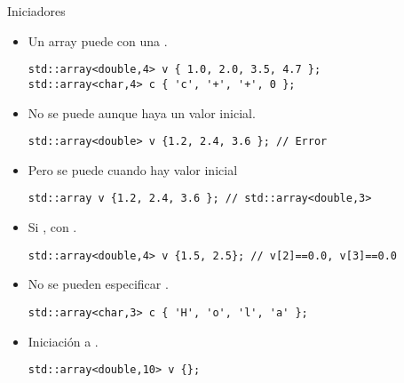 \begin{frame}[t,fragile]{Iniciadores}
\begin{itemize}
  \item Un array puede  con una .
\begin{lstlisting}
std::array<double,4> v { 1.0, 2.0, 3.5, 4.7 };
std::array<char,4> c { 'c', '+', '+', 0 };
\end{lstlisting}

  \item No se puede  aunque haya un valor inicial.
\begin{lstlisting}
std::array<double> v {1.2, 2.4, 3.6 }; // Error
\end{lstlisting}

  \item Pero se puede  cuando hay valor inicial
\begin{lstlisting}
std::array v {1.2, 2.4, 3.6 }; // std::array<double,3>
\end{lstlisting}

  \item Si ,  con .
\begin{lstlisting}
std::array<double,4> v {1.5, 2.5}; // v[2]==0.0, v[3]==0.0
\end{lstlisting}

  \item No se pueden especificar .
\begin{lstlisting}
std::array<char,3> c { 'H', 'o', 'l', 'a' };
\end{lstlisting}

  \item Iniciación a .
\begin{lstlisting}
std::array<double,10> v {};
\end{lstlisting}
\end{itemize}
\end{frame}

